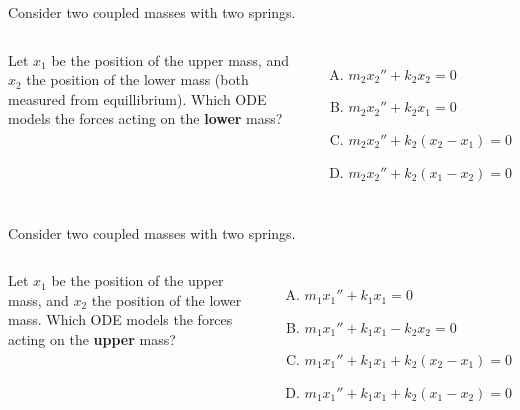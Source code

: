 \begin{applicationActivities}

\begin{activity}{10}
Consider two coupled masses with two springs. 

\vfill

\begin{columns}
\springdoublemass
{}
Let \(x_1\) be the position of the upper mass, and \(x_2\) the position of the lower mass (both measured from equillibrium).  Which ODE models the forces acting on the \textbf{lower} mass?
\vfill
\begin{enumerate} [(A)]
\item \(m_2x_2'' +k_2 x_2 = 0 \)
\item \(m_2x_2'' +k_2 x_1 = 0 \)
\item \(m_2x_2'' +k_2 (x_2-x_1) = 0 \)
\item \(m_2x_2'' +k_2 (x_1-x_2) = 0 \)
\end{enumerate}
\end{columns}
\end{activity}

\begin{activity}{5}
Consider two coupled masses with two springs. 

\vfill

\begin{columns}
\springdoublemass
{}
Let \(x_1\) be the position of the upper mass, and \(x_2\) the position of the lower mass.  Which ODE models the forces acting on the \textbf{upper} mass?
\vfill
\begin{enumerate} [(A)]
\item \(m_1x_1'' +k_1 x_1 = 0 \)
\item \(m_1x_1'' +k_1 x_1 -k_2x_2= 0 \)
\item \(m_1x_1'' +k_1 x_1 + k_2(x_2-x_1) = 0 \)
\item \(m_1x_1'' +k_1 x_1 + k_2(x_1-x_2) = 0 \)
\end{enumerate}
\end{columns}
\end{activity}


\end{applicationActivities}
